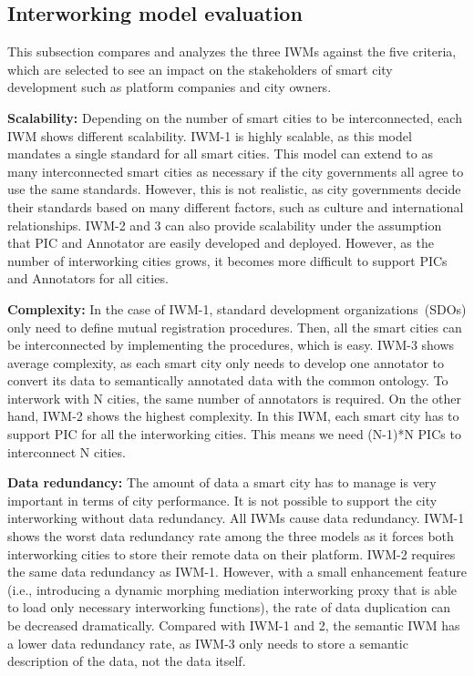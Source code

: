 \subsection{Interworking model evaluation}

This subsection compares and analyzes the three IWMs against the five criteria, which are selected to see an impact on the stakeholders of smart city development such as platform companies and city owners.

\textbf{Scalability:} Depending on the number of smart cities to be interconnected, each IWM shows different scalability. IWM-1 is highly scalable, as this model mandates a single standard for all smart cities. This model can extend to as many interconnected smart cities as necessary if the city governments all agree to use the same standards. However, this is not realistic, as city governments decide their standards based on many different factors, such as culture and international relationships. IWM-2 and 3 can also provide scalability under the assumption that PIC and Annotator are easily developed and deployed. However, as the number of interworking cities grows, it becomes more difficult to support PICs and Annotators for all cities.

\textbf{Complexity:} In the case of IWM-1, standard development organizations~(SDOs) only need to define mutual registration procedures. Then, all the smart cities can be interconnected by implementing the procedures, which is easy. IWM-3 shows average complexity, as each smart city only needs to develop one annotator to convert its data to semantically annotated data with the common ontology. To interwork with N cities, the same number of annotators is required. On the other hand, IWM-2 shows the highest complexity. In this IWM, each smart city has to support PIC for all the interworking cities. This means we need (N-1)*N PICs to interconnect N cities.   

\textbf{Data redundancy:} The amount of data a smart city has to manage is very important in terms of city performance. It is not possible to support the city interworking without data redundancy. All IWMs cause data redundancy. IWM-1 shows the worst data redundancy rate among the three models as it forces both interworking cities to store their remote data on their platform. IWM-2 requires the same data redundancy as IWM-1. However, with a small enhancement feature (i.e., introducing a dynamic morphing mediation interworking proxy that is able to load only necessary interworking functions), the rate of data duplication can be decreased dramatically. Compared with IWM-1 and 2, the semantic IWM has a lower data redundancy rate, as IWM-3 only needs to store a semantic description of the data, not the data itself.

